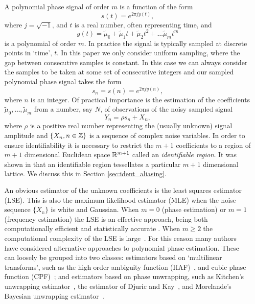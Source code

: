 \documentclass[journal]{IEEEtran}
\begin{document}
A polynomial phase signal of order $m$ is a function of the form
\[
s(t) = e^{2\pi j y(t)},
\]
where $j = \sqrt{-1}$, and $t$ is a real number, often representing time, and 
\[
y(t) = \tilde{\mu}_0 +\tilde{\mu}_1 t + \tilde{\mu}_2 t^2 + \dots \tilde{\mu}_m t^m
\]
is a polynomial of order $m$.  In practice the signal is typically sampled at discrete points in `time', $t$. In this paper we only consider uniform sampling, where the gap between consecutive samples is constant. In this case we can always consider the samples to be taken at some set of consecutive integers and our sampled polynomial phase signal takes the form
\[
s_n = s(n) = e^{2\pi j y(n)},
\] 
where $n$ is an integer.  Of practical importance is the estimation of the coefficients $\tilde{\mu}_0, \dots, \tilde{\mu}_m$ from a number, say $N$, of observations of the noisy sampled signal
\begin{equation}\label{eq:Y_nsamplednoisey}
Y_n = \rho s_n + X_n,
\end{equation}
where $\rho$ is a positive real number representing the (usually unknown) signal amplitude and $\{X_n, n \in {\mathbb Z}\}$ is a sequence of complex noise variables. In order to ensure identifiability it is necessary to restrict the $m+1$ coefficients to a region of $m+1$ dimensional Euclidean space ${\mathbb R}^{m+1}$ called an \emph{identifiable region}.  It was shown in \cite{McKilliam2009IndentifiabliltyAliasingPolyphase} that an identifiable region tessellates a particular $m+1$ dimensional lattice.  We discuss this in Section \ref{sec:ident_aliasing}.

An obvious estimator of the unknown coefficients is the least squares estimator (LSE).  This is also the maximum likelihood estimator (MLE) when the noise sequence $\{X_n\}$ is white and Gaussian.  When $m=0$ (phase estimation) or $m=1$ (frequency estimation) the LSE is an effective approach, being both computationally efficient and statistically accurate \cite{Quinn2009_dasp_phase_only_information_loss,Hannan1973,Quinn2001,McKilliam_mean_dir_est_sq_arc_length2010,McKilliam2010thesis}. When $m \geq 2$ the computational complexity of the LSE is large~\cite{McKilliam2010thesis,Abatzoglou_ml_chirp_1986}. For this reason many authors have considered alternative approaches to polynomial phase estimation. These can loosely be grouped into two classes: estimators based on `multilinear transforms', such as the high order ambiguity function (HAF)~\cite{Peleg_DPT_1995,Peleg1991_est_class_PPS_1991,Porat_asympt_HAF_DPT_1996,Farquharson_another_poly_est_2005,Boashash_Oshea_1994}, and cubic phase function (CPF)~\cite{Oshea_cpf_2004,Oshea_cpf_2002_letter,Djurovic_haf_cpf_2012}; and estimators based on phase unwrapping, such as Kitchen's unwrapping estimator~\cite{Kitchen_polyphase_unwrapping_1994}, the estimator of Djuric and Kay~\cite{Djuric_phase_unwrap_chirp_1990}, and Morelande's Bayesian unwrapping estimator~\cite{Morelande_bayes_unwrapping_2009_tsp}.
\end{document}
